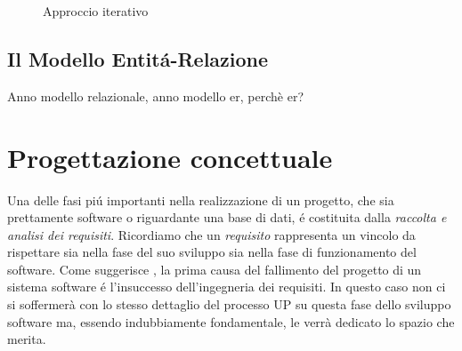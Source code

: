 \documentclass[12pt,a4paper,onecolumn,x11names]{article}
\begin{document}
\begin{flushleft}
			\begin{center}
			\begin{figure}[h]
				\centering{}
				\caption{Approccio iterativo}
			\end{figure}
		\end{center}
		
		
		\newpage
	\end{flushleft}

\subsection{Il Modello Entit\'{a}-Relazione}
	\begin{flushleft}
		Anno modello relazionale, anno modello er, perchè er?
	\end{flushleft}


\newpage

\section{Progettazione concettuale}

	Una delle fasi pi\'{u} importanti nella realizzazione di un progetto, che sia prettamente software o riguardante una base di dati, \'{e} costituita dalla \textit{raccolta e analisi dei requisiti}. Ricordiamo che un \textit{requisito} rappresenta un vincolo da rispettare sia nella fase del suo sviluppo sia nella fase di funzionamento del software. Come suggerisce \cite{Arlow}, la prima causa del fallimento del progetto di un sistema software \'{e} l'insuccesso dell'ingegneria dei requisiti. In questo caso non ci si soffermerà con lo stesso dettaglio del processo UP su questa fase dello sviluppo software ma, essendo indubbiamente fondamentale, le verrà dedicato lo spazio che merita.
	\newline
	
\end{document}
